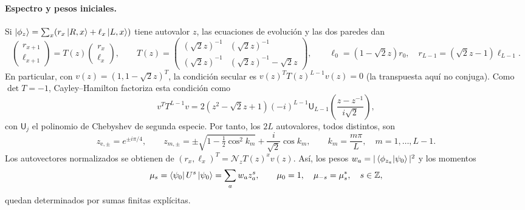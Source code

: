 \paragraph{Espectro y pesos iniciales.}
Si $\ket{\phi_z}=\sum_x(r_x\ket{R,x}+\ell_x\ket{L,x})$ tiene autovalor $z$,
las ecuaciones de evolución y las dos paredes dan
\begin{equation}
 \begin{pmatrix}r_{x+1}\\\ell_{x+1}\end{pmatrix}
 =T(z)\begin{pmatrix}r_x\\\ell_x\end{pmatrix},\qquad
 T(z)=\begin{pmatrix}
 (\sqrt2 z)^{-1}&(\sqrt2 z)^{-1}\\
 (\sqrt2 z)^{-1}&(\sqrt2 z)^{-1}-\sqrt2 z
 \end{pmatrix},\qquad
 \ell_0=(1-\sqrt2 z)r_0,\quad
 r_{L-1}=(\sqrt2 z-1)\ell_{L-1}.
 \label{eq:hadamard-line-transfer}
\end{equation}
En particular, con $v(z)=(1,1-\sqrt2 z)^T$, la condición secular es
$v(z)^T T(z)^{L-1}v(z)=0$ (la transpuesta aquí no conjuga).
Como $\det T=-1$, Cayley--Hamilton factoriza esta condición como
\begin{equation}
 v^T T^{L-1}v
 =2(z^2-\sqrt2 z+1)(-i)^{L-1}
 \mathsf U_{L-1}\!\left(\frac{z-z^{-1}}{i\sqrt2}\right),
 \label{eq:hadamard-line-secular}
\end{equation}
con $\mathsf U_j$ el polinomio de Chebyshev de segunda especie.
Por tanto, los $2L$ autovalores, todos distintos, son
\begin{equation}
 \boxed{\quad z_{\mathrm e,\pm}=e^{\pm i\pi/4},\qquad
 z_{m,\pm}=\pm\sqrt{1-\tfrac12\cos^2 k_m}
              +\frac{i}{\sqrt2}\cos k_m,\qquad
 k_m=\frac{m\pi}{L},\quad m=1,\ldots,L-1.\quad}
 \label{eq:hadamard-line-spectrum}
\end{equation}
Los autovectores normalizados se obtienen de
$(r_x,\ell_x)^T=\mathcal N_z T(z)^x v(z)$.
Así, los pesos $w_a=|\braket{\phi_{z_a}}{\psi_0}|^2$ y los momentos
\begin{equation}
 \mu_s=\bra{\psi_0}U^s\ket{\psi_0}
      =\sum_a w_a z_a^s,\qquad
 \mu_0=1,\quad\mu_{-s}=\mu_s^*,\quad s\in\mathbb Z,
 \label{eq:hadamard-line-moments}
\end{equation}
quedan determinados por sumas finitas explícitas.


